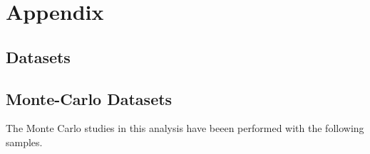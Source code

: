 
\chapter{Appendix}
\label{ch:app:physics}

\section{Datasets}


\section{Monte-Carlo Datasets}

The Monte Carlo studies in this analysis have beeen performed with the following samples.

